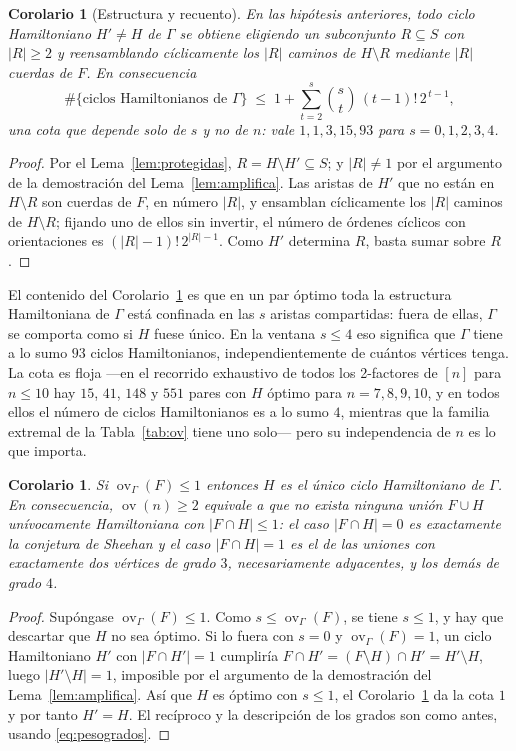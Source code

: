 \documentclass[11pt,a4paper]{article}
\newtheorem{corolario}[teorema]{Corolario}
\theoremstyle{definition}
\theoremstyle{remark}
\newcommand{\ov}{\operatorname{ov}}
\begin{document}
\begin{corolario}[Estructura y recuento]\label{cor:recuento}
En las hipótesis anteriores, todo ciclo Hamiltoniano $H'\ne H$ de $\Gamma$ se obtiene eligiendo un subconjunto $R\subseteq S$ con $|R|\ge2$ y reensamblando cíclicamente los $|R|$ caminos de $H\setminus R$ mediante $|R|$ cuerdas de $F$. En consecuencia
\[
\#\{\text{ciclos Hamiltonianos de }\Gamma\}\;\le\;1+\sum_{t=2}^{s}\binom{s}{t}\,(t-1)!\,2^{\,t-1},
\]
una cota que depende solo de $s$ y no de $n$: vale $1,1,3,15,93$ para $s=0,1,2,3,4$.
\end{corolario}

\begin{proof}
Por el Lema~\ref{lem:protegidas}, $R=H\setminus H'\subseteq S$; y $|R|\ne1$ por el argumento de la demostración del Lema~\ref{lem:amplifica}. Las aristas de $H'$ que no están en $H\setminus R$ son cuerdas de $F$, en número $|R|$, y ensamblan cíclicamente los $|R|$ caminos de $H\setminus R$; fijando uno de ellos sin invertir, el número de órdenes cíclicos con orientaciones es $(|R|-1)!\,2^{|R|-1}$. Como $H'$ determina $R$, basta sumar sobre $R$.
\end{proof}

El contenido del Corolario~\ref{cor:recuento} es que en un par óptimo toda la estructura Hamiltoniana de $\Gamma$ está confinada en las $s$ aristas compartidas: fuera de ellas, $\Gamma$ se comporta como si $H$ fuese único. En la ventana $s\le4$ eso significa que $\Gamma$ tiene a lo sumo $93$ ciclos Hamiltonianos, independientemente de cuántos vértices tenga. La cota es floja —en el recorrido exhaustivo de todos los 2-factores de $[n]$ para $n\le10$ hay $15$, $41$, $148$ y $551$ pares con $H$ óptimo para $n=7,8,9,10$, y en todos ellos el número de ciclos Hamiltonianos es a lo sumo $4$, mientras que la familia extremal de la Tabla~\ref{tab:ov} tiene uno solo— pero su independencia de $n$ es lo que importa.

\begin{corolario}\label{cor:ov2}
Si $\ov_\Gamma(F)\le1$ entonces $H$ es el único ciclo Hamiltoniano de $\Gamma$. En consecuencia, $\ov(n)\ge2$ equivale a que no exista ninguna unión $F\cup H$ unívocamente Hamiltoniana con $|F\cap H|\le1$: el caso $|F\cap H|=0$ es exactamente la conjetura de Sheehan y el caso $|F\cap H|=1$ es el de las uniones con exactamente dos vértices de grado $3$, necesariamente adyacentes, y los demás de grado $4$.
\end{corolario}

\begin{proof}
Supóngase $\ov_\Gamma(F)\le1$. Como $s\le\ov_\Gamma(F)$, se tiene $s\le1$, y hay que descartar que $H$ no sea óptimo. Si lo fuera con $s=0$ y $\ov_\Gamma(F)=1$, un ciclo Hamiltoniano $H'$ con $|F\cap H'|=1$ cumpliría $F\cap H'=(F\setminus H)\cap H'=H'\setminus H$, luego $|H'\setminus H|=1$, imposible por el argumento de la demostración del Lema~\ref{lem:amplifica}. Así que $H$ es óptimo con $s\le1$, el Corolario~\ref{cor:recuento} da la cota $1$ y por tanto $H'=H$. El recíproco y la descripción de los grados son como antes, usando \eqref{eq:pesogrados}.
\end{proof}
\end{document}
